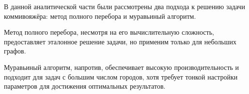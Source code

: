 \hspace{1.25cm}
В данной аналитической части были рассмотрены два подхода к решению задачи коммивояжёра: метод полного перебора и муравьиный алгоритм.

Метод полного перебора, несмотря на его вычислительную сложность, предоставляет эталонное решение задачи, но применим только для небольших графов.

Муравьиный алгоритм, напротив, обеспечивает высокую производительность и подходит для задач с большим числом городов, хотя требует тонкой настройки параметров для достижения оптимальных результатов.

\newpage